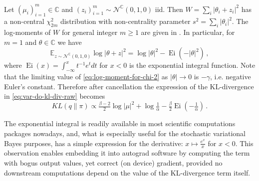 \documentclass[a4paper,10pt]{article}
\newcommand{\cplx}{\mathbb{C}}
\begin{document}
Let $(\mu_i)_{i=1}^m \in \cplx$ and $
  (z_i)_{i=1}^m \sim \mathcal{N}^{\cplx}(0, 1, 0)
$ iid. Then $W = \sum_i \lvert \theta_i + z_i \rvert^2$ has a non-central $\chi^2_{2m}$
distribution with non-centrality parameter $s^2 = \sum_i \lvert \theta_i \rvert^2$. The
log-moments of $W$ for general integer $m \geq1$ are given in
\cite[p.~2466]{lapidoth_capacity_2003}.  %
In particular, for $m=1$ and $\theta\in \cplx$ we have
\begin{equation}  \label{eq:log-moment-for-chi-2}
\mathbb{E}_{z \sim \mathcal{N}^{\cplx}(0, 1, 0)}
  \log \lvert \theta + z \rvert^2
  = \log \lvert \theta \rvert^2 - \mathop{Ei}( - \lvert \theta \rvert^2)
  \,,
\end{equation}
where $\mathop{Ei}(x) = \int^x_{-\infty} t^{-1} e^t dt$ for $x < 0$ is the exponential integral
function. Note that the limiting value of \eqref{eq:log-moment-for-chi-2} as $
  \lvert \theta \rvert \to 0
$ is $- \gamma$, i.e. negative Euler's constant. Therefore after cancellation the expression
of the KL-divergence in \eqref{eq:var-do-kl-div-raw} becomes
\begin{equation}  \label{eq:var-do-kl-div}
KL(q\| \pi)
  \propto
    \tfrac{\beta-2}2 \log{\lvert \mu \rvert^2}
    + \log{\tfrac1{\alpha}}
    - \tfrac{\beta}2 \mathop{Ei}(- \tfrac1{\alpha})
  \,.
\end{equation}

The exponential integral is readily available in most scientific computations packages nowadays,
and, what is especially useful for the stochastic variational Bayes purposes, has a simple
expression for the derivative: $x \mapsto \tfrac{e^x}{x}$ for $x < 0$. This observation enables
embedding it into autograd software by computing the term with bogus output values, yet correct
(on device) gradient, provided no downstream computations depend on the value of the KL-divergence
term itself.
\end{document}
